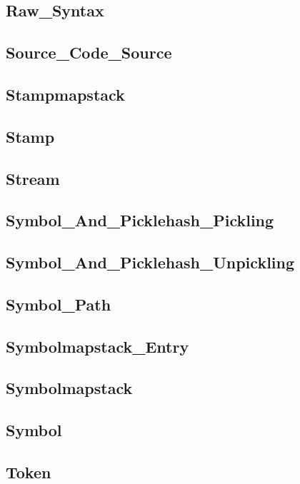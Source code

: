 \subsection{Raw\_Syntax}				
\subsection{Source\_Code\_Source}			
\subsection{Stampmapstack}				
\subsection{Stamp}					
\subsection{Stream}					
\subsection{Symbol\_And\_Picklehash\_Pickling}		
\subsection{Symbol\_And\_Picklehash\_Unpickling}	
\subsection{Symbol\_Path}				
\subsection{Symbolmapstack\_Entry}			
\subsection{Symbolmapstack}				
\subsection{Symbol}					
\subsection{Token}					

